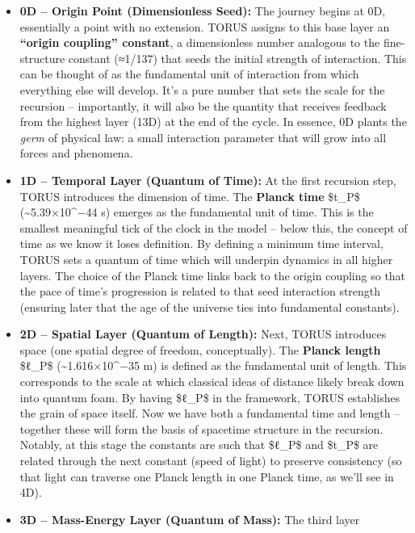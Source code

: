 \begin{itemize}
\item
  \textbf{0D -- Origin Point (Dimensionless Seed):} The journey begins
  at 0D, essentially a point with no extension. TORUS assigns to this
  base layer an \textbf{``origin coupling'' constant}, a dimensionless
  number analogous to the fine-structure constant (≈1/137) that seeds
  the initial strength of interaction​. This can be thought of as the
  fundamental unit of interaction from which everything else will
  develop. It's a pure number that sets the scale for the recursion --
  importantly, it will also be the quantity that receives feedback from
  the highest layer (13D) at the end of the cycle. In essence, 0D plants
  the \emph{germ} of physical law: a small interaction parameter that
  will grow into all forces and phenomena.
\item
  \textbf{1D -- Temporal Layer (Quantum of Time):} At the first
  recursion step, TORUS introduces the dimension of time. The
  \textbf{Planck time} \$t\_P\$ (\textasciitilde{}5.39×10\^{}−44 s)
  emerges as the fundamental unit of time​. This is the smallest
  meaningful tick of the clock in the model -- below this, the concept
  of time as we know it loses definition. By defining a minimum time
  interval, TORUS sets a quantum of time which will underpin dynamics in
  all higher layers. The choice of the Planck time links back to the
  origin coupling so that the pace of time's progression is related to
  that seed interaction strength (ensuring later that the age of the
  universe ties into fundamental constants).
\item
  \textbf{2D -- Spatial Layer (Quantum of Length):} Next, TORUS
  introduces space (one spatial degree of freedom, conceptually). The
  \textbf{Planck length} \$ℓ\_P\$ (\textasciitilde{}1.616×10\^{}−35 m)
  is defined as the fundamental unit of length​. This corresponds to the
  scale at which classical ideas of distance likely break down into
  quantum foam. By having \$ℓ\_P\$ in the framework, TORUS establishes
  the grain of space itself. Now we have both a fundamental time and
  length -- together these will form the basis of spacetime structure in
  the recursion. Notably, at this stage the constants are such that
  \$ℓ\_P\$ and \$t\_P\$ are related through the next constant (speed of
  light) to preserve consistency (so that light can traverse one Planck
  length in one Planck time, as we'll see in 4D).
\item
  \textbf{3D -- Mass-Energy Layer (Quantum of Mass):} The third layer

\end{itemize}
